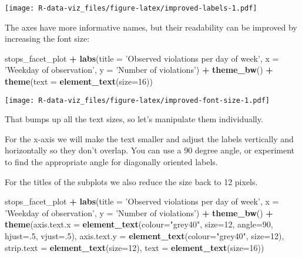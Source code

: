 \documentclass[]{book}
\newenvironment{Shaded}{\begin{snugshade}}{\end{snugshade}}
\newcommand{\DataTypeTok}[1]{\textcolor[rgb]{0.13,0.29,0.53}{#1}}
\newcommand{\DecValTok}[1]{\textcolor[rgb]{0.00,0.00,0.81}{#1}}
\newcommand{\KeywordTok}[1]{\textcolor[rgb]{0.13,0.29,0.53}{\textbf{#1}}}
\newcommand{\NormalTok}[1]{#1}
\newcommand{\OperatorTok}[1]{\textcolor[rgb]{0.81,0.36,0.00}{\textbf{#1}}}
\newcommand{\StringTok}[1]{\textcolor[rgb]{0.31,0.60,0.02}{#1}}
\begin{document}
\texttt{[image: R-data-viz\_files/figure-latex/improved-labels-1.pdf]}

The axes have more informative names, but their readability can be improved by
increasing the font size:

\begin{Shaded}
\begin{Highlighting}[]
\NormalTok{stops_facet_plot }\OperatorTok{+}
\StringTok{  }\KeywordTok{labs}\NormalTok{(}\DataTypeTok{title =} \StringTok{'Observed violations per day of week'}\NormalTok{,}
         \DataTypeTok{x =} \StringTok{'Weekday of observation'}\NormalTok{,}
         \DataTypeTok{y =} \StringTok{'Number of violations'}\NormalTok{) }\OperatorTok{+}
\StringTok{  }\KeywordTok{theme_bw}\NormalTok{() }\OperatorTok{+}\StringTok{ }
\StringTok{  }\KeywordTok{theme}\NormalTok{(}\DataTypeTok{text =} \KeywordTok{element_text}\NormalTok{(}\DataTypeTok{size=}\DecValTok{16}\NormalTok{))}
\end{Highlighting}
\end{Shaded}

\texttt{[image: R-data-viz\_files/figure-latex/improved-font-size-1.pdf]}

That bumps up all the text sizes, so let's manipulate them individually.

For the x-axis we will make the text smaller and adjust the labels vertically and horizontally so they don't overlap. You can use a 90 degree angle, or experiment to find the appropriate angle for diagonally oriented labels.

For the titles of the subplots we also reduce the size back to 12 pixels.

\begin{Shaded}
\begin{Highlighting}[]
\NormalTok{stops_facet_plot }\OperatorTok{+}
\StringTok{  }\KeywordTok{labs}\NormalTok{(}\DataTypeTok{title =} \StringTok{'Observed violations per day of week'}\NormalTok{,}
         \DataTypeTok{x =} \StringTok{'Weekday of observation'}\NormalTok{,}
         \DataTypeTok{y =} \StringTok{'Number of violations'}\NormalTok{) }\OperatorTok{+}
\StringTok{  }\KeywordTok{theme_bw}\NormalTok{() }\OperatorTok{+}\StringTok{ }
\StringTok{  }\KeywordTok{theme}\NormalTok{(}\DataTypeTok{axis.text.x =} \KeywordTok{element_text}\NormalTok{(}\DataTypeTok{colour=}\StringTok{"grey40"}\NormalTok{, }\DataTypeTok{size=}\DecValTok{12}\NormalTok{, }\DataTypeTok{angle=}\DecValTok{90}\NormalTok{, }\DataTypeTok{hjust=}\NormalTok{.}\DecValTok{5}\NormalTok{, }\DataTypeTok{vjust=}\NormalTok{.}\DecValTok{5}\NormalTok{),}
        \DataTypeTok{axis.text.y =} \KeywordTok{element_text}\NormalTok{(}\DataTypeTok{colour=}\StringTok{"grey40"}\NormalTok{, }\DataTypeTok{size=}\DecValTok{12}\NormalTok{),}
        \DataTypeTok{strip.text =} \KeywordTok{element_text}\NormalTok{(}\DataTypeTok{size=}\DecValTok{12}\NormalTok{),}
        \DataTypeTok{text =} \KeywordTok{element_text}\NormalTok{(}\DataTypeTok{size=}\DecValTok{16}\NormalTok{))}
\end{Highlighting}
\end{Shaded}
\end{document}
